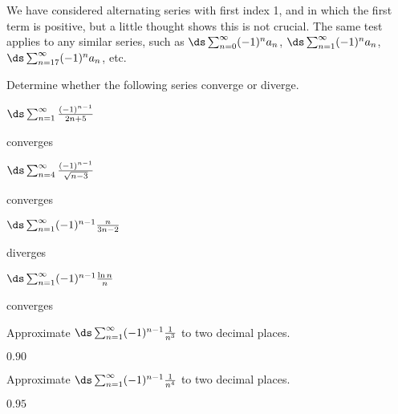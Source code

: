 We have considered alternating series with first index 1, and in which
the first term is positive, but a little thought shows this is not
crucial. The same test applies to any similar series, such as
$\ds\sum_{n=0}^\infty (-1)^n a_n$, $\ds\sum_{n=1}^\infty (-1)^n a_n$, 
$\ds\sum_{n=17}^\infty (-1)^n a_n$, etc.

\begin{exercises}

Determine whether the following series converge or diverge.

\twocol

\begin{exercise} $\ds\sum_{n=1}^\infty {(-1)^{n-1}\over 2n+5}$
\begin{answer} converges
\end{answer}\end{exercise}

\begin{exercise} $\ds\sum_{n=4}^\infty {(-1)^{n-1}\over \sqrt{n-3}}$
\begin{answer} converges
\end{answer}\end{exercise}

\begin{exercise} $\ds\sum_{n=1}^\infty (-1)^{n-1}{n\over 3n-2}$
\begin{answer} diverges
\end{answer}\end{exercise}

\begin{exercise} $\ds\sum_{n=1}^\infty (-1)^{n-1}{\ln n\over n}$
\begin{answer} converges
\end{answer}\end{exercise}
\endtwocol

\msk

\begin{exercise} Approximate $\ds\sum_{n=1}^\infty (-1)^{n-1}{1\over n^3}$ to
two decimal places.
\begin{answer} $0.90$
\end{answer}\end{exercise}

\begin{exercise} Approximate $\ds\sum_{n=1}^\infty (-1)^{n-1}{1\over n^4}$ to
two decimal places. 
\begin{answer} $0.95$
\end{answer}\end{exercise}

\end{exercises}

